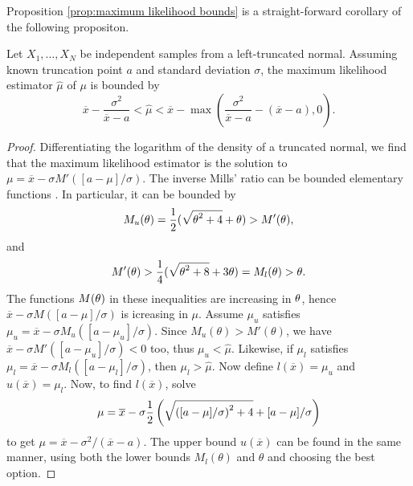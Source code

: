 Proposition \ref{prop:maximum likelihood bounds} is a straight-forward
corollary of the following propositon. 
\begin{proposition}
\label{prop:ml bouds}Let $X_{1},\ldots,X_{N}$ be independent samples
from a left-truncated normal. Assuming known truncation point $a$
and standard deviation $\sigma$, the maximum likelihood estimator
$\hat{\mu}$ of $\mu$ is bounded by
\begin{equation}
\overline{x}-\frac{\sigma^{2}}{\overline{x}-a}<\hat{\mu}<\overline{x}-\max\left(\frac{\sigma^{2}}{\overline{x}-a}-(\overline{x}-a),0\right).\label{eq:ml bounds}
\end{equation}
\end{proposition}
\begin{proof}
Differentiating the logarithm of the density of a truncated normal,
we find that the maximum likelihood estimator is the solution to $\mu=\overline{x}-\sigma M'([a-\mu]/\sigma)$. The inverse Mills' ratio can be bounded
elementary functions \parencite{Yang2015-pa}. In particular, it can be
bounded by \parencite[Equation 32]{Gasull2014-hn}
\begin{equation}
M_{u}(\theta)=\frac{1}{2}(\sqrt{\text{\ensuremath{\theta}}^{2}+4}+\text{\ensuremath{\theta}})>M'(\text{\ensuremath{\theta}}),\label{eq:Mills' ratio inequality}
\end{equation}
and 
\begin{equation}
M'(\text{\ensuremath{\theta}})>\frac{1}{4}(\sqrt{\text{\ensuremath{\theta}}^{2}+8}+3\text{\ensuremath{\theta}})=M_{l}(\theta)>\theta.\label{eq:Mill's ratio inequality (2)}
\end{equation}
The functions $M(\text{\ensuremath{\theta}})$ in these inequalities
are increasing in $\text{\ensuremath{\theta}}$, hence $\overline{x}-\sigma M([a-\mu]/\sigma)$
is icreasing in $\mu$. Assume $\mu_{u}$ satisfies $\mu_{u}=\overline{x}-\sigma M_{u}([a-\mu_{u}]/\sigma)$.
Since $M_{u}(\theta)>M'(\theta)$, we have $\overline{x}-\sigma M'([a-\mu_{u}]/\sigma)<0$
too, thus $\mu_{u}<\hat{\mu}$. Likewise, if $\mu_{l}$ satisfies
$\mu_{l}=\overline{x}-\sigma M_{l}([a-\mu_{l}]/\sigma)$, then $\mu_{l}>\hat{\mu}$.
Now define $l(\overline{x})=\mu_{u}$ and $u(\overline{x})=\mu_{l}$.
Now, to find $l(\overline{x})$, solve
\[
\mu=\overline{x}-\sigma\frac{1}{2}\left(\sqrt{\text{\ensuremath{([a-\mu]/\sigma)}}^{2}+4}+\text{\ensuremath{[a-\mu]/\sigma}}\right)
\]
to get $\mu=\overline{x}-\sigma^{2}/(\overline{x}-a)$. The upper
bound $u(\overline{x})$ can be found in the same manner, using both
the lower bounds $M_{l}(\theta)$ and $\theta$ and choosing the best
option.
\end{proof}